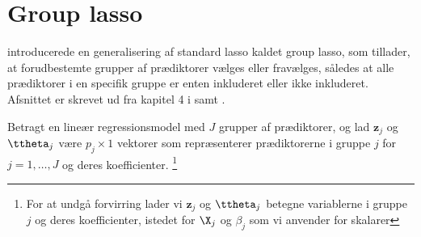 \newpage
\section{Group lasso}
\citep{group_lasso} introducerede en generalisering af standard lasso kaldet group lasso, som tillader, at forudbestemte grupper af prædiktorer vælges eller fravælges, således at alle prædiktorer i en specifik gruppe er enten inkluderet eller ikke inkluderet.
Afsnittet er skrevet ud fra kapitel 4 i \citep{hastie} samt \citep{group_lasso}.

Betragt en lineær regressionsmodel med $J$ grupper af prædiktorer, og lad $\mathbf{z}_j$ og \(\ttheta_j\) være \(p_j \times 1\) vektorer som repræsenterer prædiktorerne i gruppe $j$ for $j=1, \ldots, J$ og deres koefficienter. \footnote{For at undgå forvirring lader vi \(\mathbf{z}_j\) og \(\ttheta_j\) betegne variablerne i gruppe \(j\) og deres koefficienter, istedet for \(\X_j\) og \(\beta_j\) som vi anvender for skalarer}

